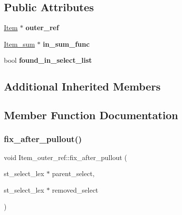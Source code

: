 \subsection*{Public Attributes}
\begin{DoxyCompactItemize}
\item 
\mbox{\label{classItem__outer__ref_a4d409b88ddeda608976ecb237d036ad4}} 
\mbox{\hyperlink{classItem}{Item}} $\ast$ {\bfseries outer\+\_\+ref}
\item 
\mbox{\label{classItem__outer__ref_ac0f66190b1caea43444899728643a05d}} 
\mbox{\hyperlink{classItem__sum}{Item\+\_\+sum}} $\ast$ {\bfseries in\+\_\+sum\+\_\+func}
\item 
\mbox{\label{classItem__outer__ref_a11dee5a66aab38e6fbca2777bb5716ab}} 
bool {\bfseries found\+\_\+in\+\_\+select\+\_\+list}
\end{DoxyCompactItemize}
\subsection*{Additional Inherited Members}


\subsection{Member Function Documentation}
\mbox{\label{classItem__outer__ref_a30ff5c4083f8d4d7c6ab5c7b2b4fac0c}} 
\subsubsection{\texorpdfstring{fix\+\_\+after\+\_\+pullout()}{fix\_after\_pullout()}}
{\footnotesize\ttfamily void Item\+\_\+outer\+\_\+ref\+::fix\+\_\+after\+\_\+pullout (\begin{DoxyParamCaption}\item[{st\+\_\+select\+\_\+lex $\ast$}]{parent\+\_\+select,  }\item[{st\+\_\+select\+\_\+lex $\ast$}]{removed\+\_\+select }\end{DoxyParamCaption})\hspace{0.3cm}{\ttfamily [virtual]}}

